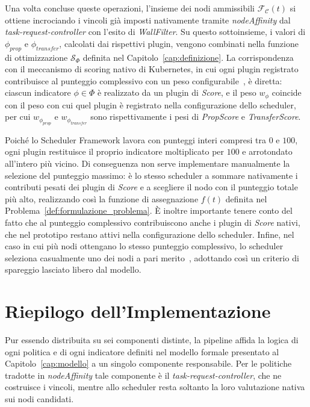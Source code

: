 Una volta concluse queste operazioni, l'insieme dei nodi ammissibili $\mathcal{F_C}(t)$ si ottiene incrociando i vincoli già imposti nativamente tramite \emph{nodeAffinity} dal \emph{task-request-controller} con l'esito di \emph{WallFilter}. Su questo sottoinsieme, i valori di $\phi_{prop}$ e $\phi_{transfer}$, calcolati dai rispettivi plugin, vengono combinati nella funzione di ottimizzazione $\mathcal{S}_\Phi$ definita nel Capitolo~\ref{cap:definizione}. La corrispondenza con il meccanismo di scoring nativo di Kubernetes, in cui ogni plugin registrato contribuisce al punteggio complessivo con un peso configurabile~\cite{k8s-scheduler-config}, è diretta: ciascun indicatore $\phi \in \Phi$ è realizzato da un plugin di \emph{Score}, e il peso $w_\phi$ coincide con il peso con cui quel plugin è registrato nella configurazione dello scheduler, per cui $w_{\phi_{prop}}$ e $w_{\phi_{transfer}}$ sono rispettivamente i pesi di \emph{PropScore} e \emph{TransferScore}. 

Poiché lo Scheduler Framework lavora con punteggi interi compresi tra $0$ e $100$, ogni plugin restituisce il proprio indicatore moltiplicato per $100$ e arrotondato all'intero più vicino. Di conseguenza non serve implementare manualmente la selezione del punteggio massimo: è lo stesso scheduler a sommare nativamente i contributi pesati dei plugin di \emph{Score} e a scegliere il nodo con il punteggio totale più alto, realizzando così la funzione di assegnazione $f(t)$ definita nel Problema~\ref{def:formulazione_problema}. È inoltre importante tenere conto del fatto che al punteggio complessivo contribuiscono anche i plugin di \emph{Score} nativi, che nel prototipo restano attivi nella configurazione dello scheduler. Infine, nel caso in cui più nodi ottengano lo stesso punteggio complessivo, lo scheduler seleziona casualmente uno dei nodi a pari merito~\cite{k8s-scheduler}, adottando così un criterio di spareggio lasciato libero dal modello.


\section{Riepilogo dell'Implementazione}
\label{sec:sintesi_implementazione}

Pur essendo distribuita su sei componenti distinte, la pipeline affida la logica di ogni politica e di ogni indicatore definiti nel modello formale presentato al Capitolo~\ref{cap:modello} a un singolo componente responsabile. Per le politiche tradotte in \emph{nodeAffinity} tale componente è il \emph{task-request-controller}, che ne costruisce i vincoli, mentre allo scheduler resta soltanto la loro valutazione nativa sui nodi candidati.

